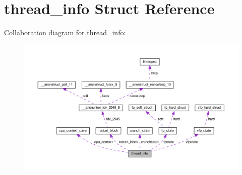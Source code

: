 \hypertarget{structthread__info}{}\section{thread\+\_\+info Struct Reference}
\label{structthread__info}


Collaboration diagram for thread\+\_\+info\+:
\nopagebreak
\begin{figure}[H]
\begin{center}
\leavevmode
\includegraphics[width=350pt]{structthread__info__coll__graph}
\end{center}
\end{figure}

